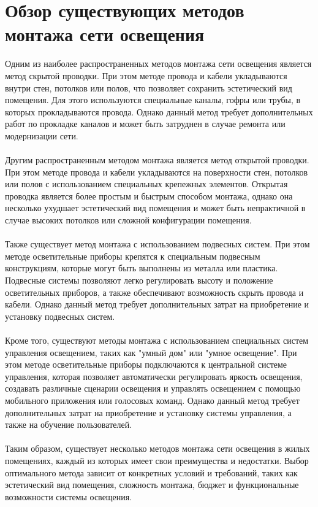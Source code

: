 \documentclass{article}
\begin{document}
\newpage
\section{Обзор существующих методов монтажа сети освещения}
Одним из наиболее распространенных методов монтажа сети освещения является метод скрытой проводки. При этом методе провода и кабели укладываются внутри стен, потолков или полов, что позволяет сохранить эстетический вид помещения. Для этого используются специальные каналы, гофры или трубы, в которых прокладываются провода. Однако данный метод требует дополнительных работ по прокладке каналов и может быть затруднен в случае ремонта или модернизации сети.\\
~\\
Другим распространенным методом монтажа является метод открытой проводки. При этом методе провода и кабели укладываются на поверхности стен, потолков или полов с использованием специальных крепежных элементов. Открытая проводка является более простым и быстрым способом монтажа, однако она несколько ухудшает эстетический вид помещения и может быть непрактичной в случае высоких потолков или сложной конфигурации помещения.\\
~\\
Также существует метод монтажа с использованием подвесных систем. При этом методе осветительные приборы крепятся к специальным подвесным конструкциям, которые могут быть выполнены из металла или пластика. Подвесные системы позволяют легко регулировать высоту и положение осветительных приборов, а также обеспечивают возможность скрыть провода и кабели. Однако данный метод требует дополнительных затрат на приобретение и установку подвесных систем.\\
~\\
Кроме того, существуют методы монтажа с использованием специальных систем управления освещением, таких как "{}умный дом"{} или "{}умное освещение"{}. При этом методе осветительные приборы подключаются к центральной системе управления, которая позволяет автоматически регулировать яркость освещения, создавать различные сценарии освещения и управлять освещением с помощью мобильного приложения или голосовых команд. Однако данный метод требует дополнительных затрат на приобретение и установку системы управления, а также на обучение пользователей.\\
~\\
Таким образом, существует несколько методов монтажа сети освещения в жилых помещениях, каждый из которых имеет свои преимущества и недостатки. Выбор оптимального метода зависит от конкретных условий и требований, таких как эстетический вид помещения, сложность монтажа, бюджет и функциональные возможности системы освещения.
\end{document}

